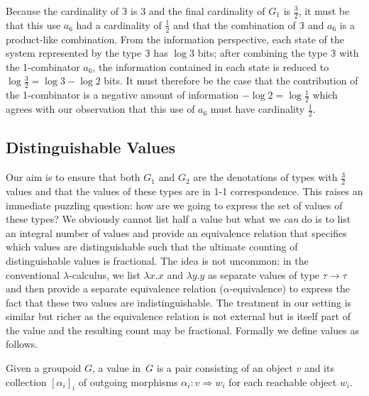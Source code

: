 Because the cardinality of $\mathbb{3}$ is 3 and the final cardinality
of $G_1$ is $\frac{3}{2}$, it must be that this use $a_6$ had a
cardinality of $\frac{1}{2}$ and that the combination of $\mathbb{3}$
and $a_6$ is a product-like combination. From the information
perspective, each state of the system represented by the type
$\mathbb{3}$ has $\log 3$ bits; after combining the type $\mathbb{3}$
with the 1-combinator $a_6$, the information contained in each state
is reduced to $\log \frac{3}{2} = \log 3 - \log 2$ bits. It must
therefore be the case that the contribution of the 1-combinator is a
negative amount of information $- \log 2 = \log \frac{1}{2}$ which
agrees with our observation that this use of $a_6$ must have
cardinality $\frac{1}{2}$.

\subsection{Distinguishable Values}

Our aim is to ensure that both $G_1$ and $G_2$ are the denotations of
types with $\frac{3}{2}$ values and that the values of these types are
in 1-1 correspondence. This raises an immediate puzzling question: how
are we going to express the set of values of these types? We obviously
cannot list half a value but what we \emph{can} do is to list an
integral number of values and provide an equivalence relation that
specifies which values are distinguishable such that the ultimate
counting of distinguishable values is fractional. The idea is not
uncommon: in the conventional $\lambda$-calculus, we list
$\lambda x.x$ and $\lambda y.y$ as separate values of type
$\tau \rightarrow \tau$ and then provide a separate equivalence
relation ($\alpha$-equivalence) to express the fact that these two
values are indistinguishable. The treatment in our setting is similar
but richer as the equivalence relation is not external but is itself
part of the value and the resulting count may be fractional. Formally
we define values as follows.

\begin{definition} Given a groupoid $G$, a value
  in~$G$ is a pair consisting of an object $v$ and its collection
  $[\alpha_i]_i$ of outgoing morphisms $\alpha_i : v \Rightarrow w_i$
  for each reachable object $w_i$.
\end{definition}


